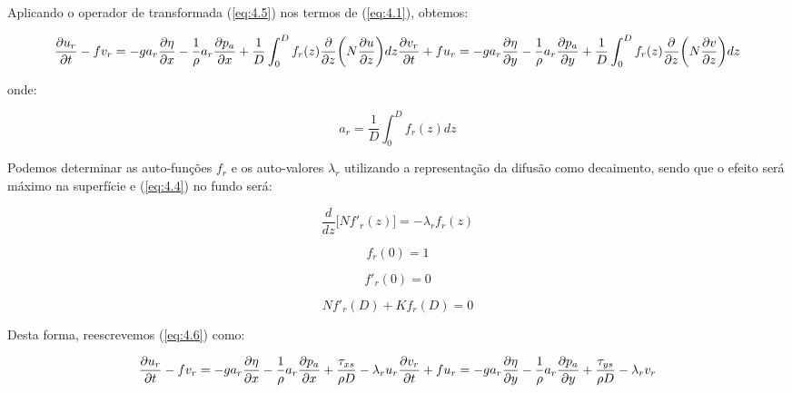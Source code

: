 \documentclass[11pt]{article}
\begin{document}
Aplicando o operador de transformada (\ref{eq:4.5}) nos termos de
(\ref{eq:4.1}), obtemos:

\begin{equation}
    \frac{\partial{u_r}}{\partial{t}} - fv_r = -ga_r\frac{\partial{\eta}}{\partial{x}} - \frac{1}{\rho}a_r\frac{\partial{p_a}}{\partial{x}} + \frac{1}{D}\int^{D}_{0}f_r(z)\frac{\partial}{\partial{z}}\bigg( N\frac{\partial{u}}{\partial{z}} \bigg)dz
    \\
    \frac{\partial{v_r}}{\partial{t}} + fu_r = -ga_r\frac{\partial{\eta}}{\partial{y}} - \frac{1}{\rho}a_r\frac{\partial{p_a}}{\partial{y}} + \frac{1}{D}\int^{D}_{0}f_r(z)\frac{\partial}{\partial{z}}\bigg( N\frac{\partial{v}}{\partial{z}} \bigg)dz
    \label{eq:4.6}
\end{equation}

onde:

\begin{equation}
    a_r = \frac{1}{D}\int^{D}_{0}f_r(z)dz
    \label{eq:4.7}
\end{equation}

Podemos determinar as auto-funções \(f_r\) e os auto-valores
\(\lambda_r\) utilizando a representação da difusão como decaimento,
sendo que o efeito será máximo na superfície e (\ref{eq:4.4}) no fundo
será:

\begin{equation}
    \frac{d}{dz}\bigg[ Nf'_r(z) \bigg] = -\lambda_r f_r(z)
\end{equation}

\begin{equation}
    f_r(0) = 1
    \label{eq:4.8}
\end{equation}

\begin{equation}
    f'_r(0) = 0
    \label{eq:4.9}
\end{equation}

\begin{equation}
    N f'_r(D) + K f_r(D) = 0
    \label{eq:4.10}
\end{equation}

Desta forma, reescrevemos (\ref{eq:4.6}) como:

\begin{equation}
    \frac{\partial{u_r}}{\partial{t}} - fv_r = -ga_r\frac{\partial{\eta}}{\partial{x}} - \frac{1}{\rho}a_r\frac{\partial{p_a}}{\partial{x}} + \frac{\tau_{xs}}{\rho D} - \lambda_ru_r
    \\
    \frac{\partial{v_r}}{\partial{t}} + fu_r = -ga_r\frac{\partial{\eta}}{\partial{y}} - \frac{1}{\rho}a_r\frac{\partial{p_a}}{\partial{y}} + \frac{\tau_{ys}}{\rho D} - \lambda_rv_r
    \label{eq:4.11}
\end{equation}
\end{document}
